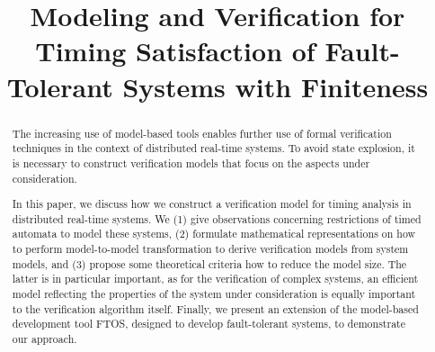 \documentclass[10pt, a4paper, onecolumn, conference, compsocconf]{IEEEtran}
\begin{document}
\title{Modeling and Verification for Timing Satisfaction of Fault-Tolerant Systems with Finiteness}




\author{
}











\maketitle


\begin{abstract}
The increasing use of model-based tools enables further use of formal verification techniques in the context of distributed real-time systems. To avoid state explosion, it is necessary to construct verification models that focus on the aspects under consideration.

In this paper, we discuss how we construct a verification model for timing analysis in distributed real-time systems.
We (1) give observations concerning restrictions of timed automata to model these systems,
(2) formulate mathematical representations on how to perform model-to-model transformation to derive verification models from system models, and (3) propose some theoretical criteria how to reduce the model size. The latter is in particular important, as for the verification of complex systems, an efficient model reflecting the properties of the system under consideration is equally important to the verification algorithm itself.
Finally, we present an extension of the model-based development tool FTOS, designed to develop fault-tolerant systems, to demonstrate our approach.
\end{abstract}






\IEEEpeerreviewmaketitle
\end{document}
